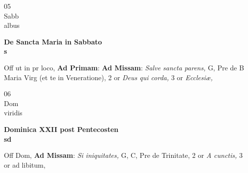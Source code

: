 \documentclass[10pt, openany]{book}
\begin{document}
        \begin{center}
            \begin{minipage}{3.5in}
                \vspace{2em}
                \begin{minipage}{0.5in}
                    {\Huge 05} \\
                    {\normalsize Sabb} \\
                    {\normalsize albus}
                \end{minipage}
                \begin{minipage}{3.0in}
                    \textbf{ \large De Sancta Maria in Sabbato \\
                    \textnormal{\normalsize s}} \\ 
                \end{minipage}
                \begin{justify}Off ut in pr loco, \textbf{Ad Primam}: \textbf{Ad Missam}: \textit{Salve sancta parens,} G, Pre de B Maria Virg (et te in Veneratione), 2 or \textit{Deus qui corda,} 3 or \textit{Ecclesiæ,}  
                \end{justify}
            \end{minipage}
        \end{center}
    
        \begin{center}
            \begin{minipage}{3.5in}
                \vspace{2em}
                \begin{minipage}{0.5in}
                    {\Huge 06} \\
                    {\normalsize Dom} \\
                    {\normalsize viridis}
                \end{minipage}
                \begin{minipage}{3.0in}
                    \textbf{ \large Dominica XXII post Pentecosten \\
                    \textnormal{\normalsize sd}} \\ 
                \end{minipage}
                \begin{justify}Off Dom, \textbf{Ad Missam}: \textit{Si iniquitates,} G, C, Pre de Trinitate, 2 or \textit{A cunctis,} 3 or ad libitum,  
                \end{justify}
            \end{minipage}
        \end{center}
    
\end{document}
